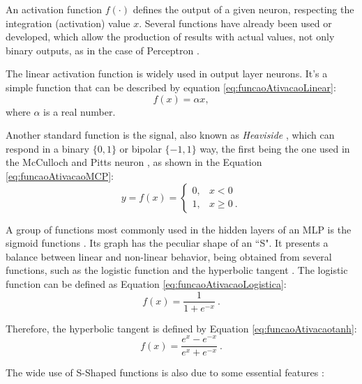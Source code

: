 \documentclass[ruled,graybox]{svmult}
\begin{document}
An activation function $f(\cdot)$ defines the output of a given neuron, respecting the integration (activation) value $x$. Several functions have already been used or developed, which allow the production of results with actual values, not only binary outputs, as in the case of Perceptron \cite{haykin}. %

The linear activation function is widely used in output layer neurons. It's a simple function that can be described by equation \ref{eq:funcaoAtivacaoLinear}:
\begin{equation}
	\label{eq:funcaoAtivacaoLinear}
	f(x) = \alpha x,
\end{equation}
where $\alpha$ is a real number.

Another standard function is the signal, also known as \textit{Heaviside} \cite{haykin}, which can respond in a binary $\{0, 1\}$ or bipolar $\{-1, 1\}$ way, the first being the one used in the McCulloch and Pitts neuron \cite{McCulloch1990}, as shown in the Equation \ref{eq:funcaoAtivacaoMCP}:
\begin{equation}
	\label{eq:funcaoAtivacaoMCP}
	y = f(x) = \left\{\begin{matrix}
		0, & x < 0    \\
		1, & x \geq 0 \: .
	\end{matrix}\right.
\end{equation}

A group of functions most commonly used in the hidden layers of an MLP is the sigmoid functions \cite{haykin, Castro2006FundamentalsON}. Its graph has the peculiar shape of an ``S". It presents a balance between linear and non-linear behavior, being obtained from several functions, such as the logistic function and the hyperbolic tangent \cite{Jeffrey2008}. The logistic function can be defined as Equation \ref{eq:funcaoAtivacaoLogistica}:
\begin{equation}
	\label{eq:funcaoAtivacaoLogistica}
	f(x) = \frac{1}{1 + e^{-x}}\:.
\end{equation}

Therefore, the hyperbolic tangent is defined by Equation \ref{eq:funcaoAtivacaotanh}:
\begin{equation}
\label{eq:funcaoAtivacaotanh}
	f(x) = \frac{e^x - e^{-x}}{e^x + e^{-x}}\:.
\end{equation}

The wide use of S-Shaped functions is also due to 
some 
essential features \cite{Menon1996}:
\end{document}
